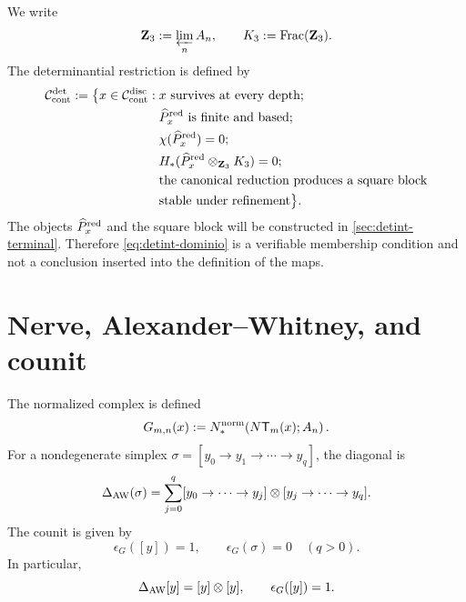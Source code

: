 We write
\begin{equation}\label{eq:detint-z3-k3}
 \mathbf Z_3:=\varprojlim_n A_n,
 \qquad
 K_3:=\operatorname{Frac}(\mathbf Z_3).
\end{equation}
The determinantial restriction is defined by
\begin{equation}\label{eq:detint-dominio}
\begin{split}
 \mathcal C_{\rm cont}^{\rm det}:=
 \bigl\{x\in\mathcal C_{\rm cont}^{\rm disc}:{}&
 x\text{ survives at every depth};\\
 &\widehat P_x^{\rm red}\text{ is finite and based};\\
 &\chi(\widehat P_x^{\rm red})=0;\\
 &H_*(\widehat P_x^{\rm red}\otimes_{\mathbf Z_3}K_3)=0;\\
 &\text{the canonical reduction produces a square block}\\
 &\text{stable under refinement}\bigr\}.
\end{split}
\end{equation}
The objects \(\widehat P_x^{\rm red}\) and the square block will be constructed
in \cref{sec:detint-terminal}. Therefore
\eqref{eq:detint-dominio} is a verifiable membership condition and not
a conclusion inserted into the definition of the maps.

\section{Nerve, Alexander--Whitney, and counit}

The normalized complex is defined
\begin{equation}\label{eq:detint-gmn}
 G_{m,n}(x):=
 N_*^{\rm norm}\!\left(N\mathsf T_m(x);A_n\right).
\end{equation}
For a nondegenerate simplex
\(\sigma=[y_0\to y_1\to\cdots\to y_q]\), the diagonal is
\begin{equation}\label{eq:detint-aw}
 \Delta_{\rm AW}(\sigma)
 =\sum_{j=0}^q
 [y_0\to\cdots\to y_j]\otimes
 [y_j\to\cdots\to y_q].
\end{equation}
The counit is given by
\begin{equation}\label{eq:detint-counidad-g}
 \epsilon_G([y])=1,
 \qquad
 \epsilon_G(\sigma)=0\quad(q>0).
\end{equation}
In particular,
\begin{equation}\label{eq:detint-vertice-grouplike}
 \Delta_{\rm AW}[y]=[y]\otimes[y],
 \qquad
 \epsilon_G([y])=1.
\end{equation}

